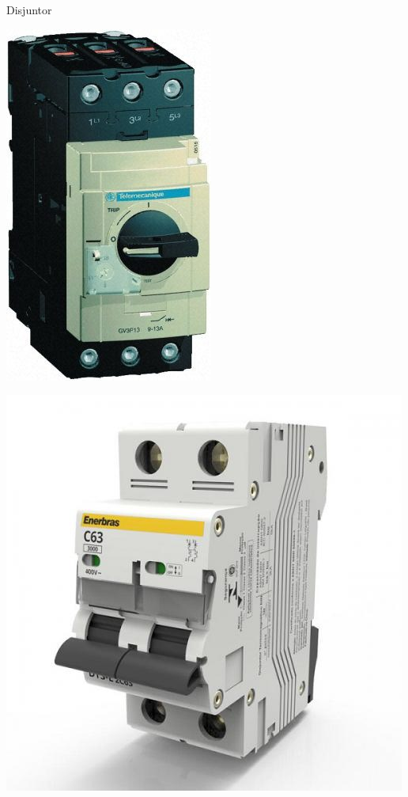 \begin{frame}{Disjuntor}
\begin{minipage}{0.3\linewidth}
		\includegraphics[width=0.6\linewidth]{Figuras/Ch04/fig8}
	\end{minipage}\hfill
	\begin{minipage}{0.3\linewidth}
		\centering
		\includegraphics[width=1\linewidth]{Figuras/Ch04/fig9}
	\end{minipage}
\end{frame}


